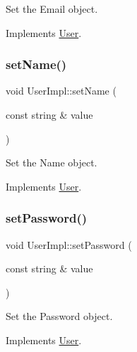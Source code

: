 Set the Email object. 



Implements \hyperlink{classUser_ac72e220fdcbb3decc392d2729f27e6b5}{User}.

\mbox{\label{classUserImpl_a30507ad79190a2ad7d896b6c4a55fab4}} 
\subsubsection{\texorpdfstring{set\+Name()}{setName()}}
{\footnotesize\ttfamily void User\+Impl\+::set\+Name (\begin{DoxyParamCaption}\item[{const string \&}]{value }\end{DoxyParamCaption})\hspace{0.3cm}{\ttfamily [virtual]}}



Set the Name object. 



Implements \hyperlink{classUser_a47339f4f166d9baa023fdd59e81c965d}{User}.

\mbox{\label{classUserImpl_a85b0f1b2faebc315a2f5e4a128137101}} 
\subsubsection{\texorpdfstring{set\+Password()}{setPassword()}}
{\footnotesize\ttfamily void User\+Impl\+::set\+Password (\begin{DoxyParamCaption}\item[{const string \&}]{value }\end{DoxyParamCaption})\hspace{0.3cm}{\ttfamily [virtual]}}



Set the Password object. 



Implements \hyperlink{classUser_a809c17ec3427917ae2e641d171cb99d2}{User}.

\mbox{\label{classUserImpl_ac273d611344f59bf69e6eabb412e84ee}} 
